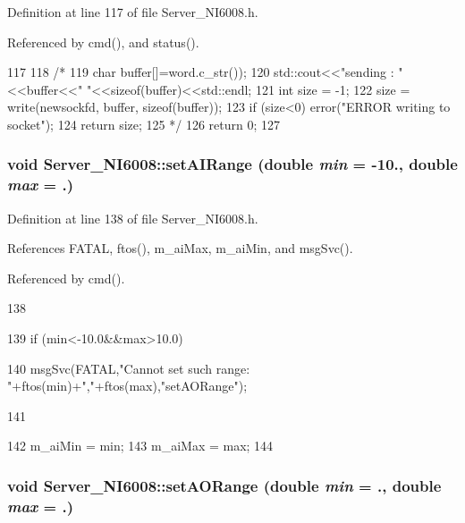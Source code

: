 Definition at line 117 of file Server\_\-NI6008.h.

Referenced by cmd(), and status().


\begin{DoxyCode}
117                              {
118     /*
119     char buffer[]=word.c_str()); 
120     std::cout<<"sending : "<<buffer<<" "<<sizeof(buffer)<<std::endl;
121     int size = -1;
122     size = write(newsockfd, buffer, sizeof(buffer));
123     if (size<0) error("ERROR writing to socket");
124     return size;
125     */
126     return 0;
127   }
\end{DoxyCode}
\hypertarget{classServer__NI6008_a120ec56f6af12d56683322f56a8d7878}{
\subsubsection[{setAIRange}]{\setlength{\rightskip}{0pt plus 5cm}void Server\_\-NI6008::setAIRange (double {\em min} = {\ttfamily -\/10.}, \/  double {\em max} = {.})}}
\label{classServer__NI6008_a120ec56f6af12d56683322f56a8d7878}


Definition at line 138 of file Server\_\-NI6008.h.

References FATAL, ftos(), m\_\-aiMax, m\_\-aiMin, and msgSvc().

Referenced by cmd().


\begin{DoxyCode}
138                                                   {
139     if (min<-10.0&&max>10.0){
140     msgSvc(FATAL,"Cannot set such range: "+ftos(min)+","+ftos(max),"setAORange");
      
141     }
142     m_aiMin = min;
143     m_aiMax = max;
144   }
\end{DoxyCode}
\hypertarget{classServer__NI6008_aec1596005b4c75cc2c13d87ab3d9d120}{
\subsubsection[{setAORange}]{\setlength{\rightskip}{0pt plus 5cm}void Server\_\-NI6008::setAORange (double {\em min} = {.}, \/  double {\em max} = {.})}}
\label{classServer__NI6008_aec1596005b4c75cc2c13d87ab3d9d120}


